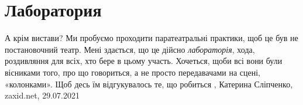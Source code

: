  
 
 
 
 
\chapter{Лаборатория}
\label{sec:slova.laboratoria}

А крім вистави?  Ми пробуємо проходити паратеатральні практики, щоб це був не постановочний
театр. Мені здається, що це дійсно \emph{лабораторія}, хода, роздивляння для всіх, хто
бере в цьому участь. Хочеться, щоби всі вони були вісниками того, про що
говориться, а не просто передавачами на сцені, «колонками». Щоб десь їм
відгукувалось те, що робиться
, 
Катерина Сліпченко, zaxid.net, 29.07.2021

